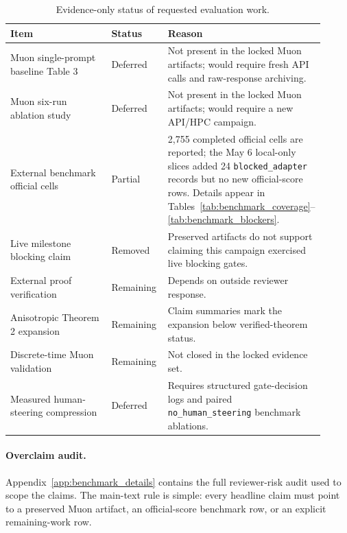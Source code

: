\documentclass{article}
\begin{document}
\begin{table}[h]
\centering
\caption{Evidence-only status of requested evaluation work.}
\label{tab:remaining}
\small
\begin{tabular}{@{}p{0.33\linewidth}p{0.18\linewidth}p{0.40\linewidth}@{}}
\toprule
\textbf{Item} & \textbf{Status} & \textbf{Reason} \\
\midrule
Muon single-prompt baseline Table 3 & Deferred & Not present in the locked Muon artifacts; would require fresh API calls and raw-response archiving. \\
Muon six-run ablation study & Deferred & Not present in the locked Muon artifacts; would require a new API/HPC campaign. \\
External benchmark official cells & Partial & 2,755 completed official cells are reported; the May 6 local-only slices added 24 \texttt{blocked\_adapter} records but no new official-score rows. Details appear in Tables~\ref{tab:benchmark_coverage}--\ref{tab:benchmark_blockers}. \\
Live milestone blocking claim & Removed & Preserved artifacts do not support claiming this campaign exercised live blocking gates. \\
External proof verification & Remaining & Depends on outside reviewer response. \\
Anisotropic Theorem 2 expansion & Remaining & Claim summaries mark the expansion below verified-theorem status. \\
Discrete-time Muon validation & Remaining & Not closed in the locked evidence set. \\
Measured human-steering compression & Deferred & Requires structured gate-decision logs and paired \texttt{no\_human\_steering} benchmark ablations. \\
\bottomrule
\end{tabular}
\end{table}

\paragraph{Overclaim audit.}
Appendix~\ref{app:benchmark_details} contains the full reviewer-risk audit used to scope the claims. The main-text rule is simple: every headline claim must point to a preserved Muon artifact, an official-score benchmark row, or an explicit remaining-work row.
\end{document}
